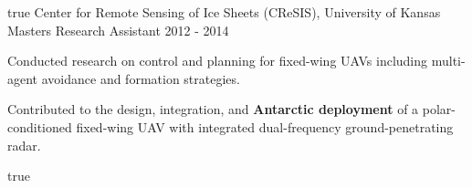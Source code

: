 \begin{cventries}
{\begin{cvitems}
      \end{cvitems}
    } %
    {} %
    {true}
    {}
%   
\cvexpentry
  	{Center for Remote Sensing of Ice Sheets (CReSIS), University of Kansas} %
  	{Masters Research Assistant} %
    {} %
    {2012 - 2014} %
    {
      \begin{cvitems} %
      	\item Conducted research on control and planning for fixed-wing UAVs including multi-agent avoidance and formation strategies.
      	\item Contributed to the design, integration, and \textbf{Antarctic deployment} of a polar-conditioned fixed-wing UAV with integrated dual-frequency ground-penetrating radar.
      \end{cvitems}
    } %
    {} %
    {true}
    {}
\end{cventries}

